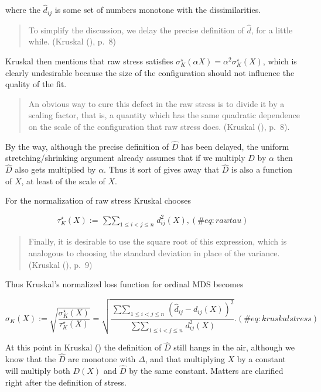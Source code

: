 \documentclass[
  12pt,
  letterpaper,
  DIV=11,
  numbers=noendperiod]{scrreprt}
\theoremstyle{remark}
\begin{document}
where the \(\hat d_{ij}\) is some set of numbers monotone with the
dissimilarities.

\begin{quote}
To simplify the discussion, we delay the precise definition of
\(\hat d\), for a little while. (Kruskal
(), p.~8)
\end{quote}

Kruskal then mentions that raw stress satisfies
\(\sigma^\star_K(\alpha X)=\alpha^2\sigma^\star_K(X)\), which is clearly
undesirable because the size of the configuration should not influence
the quality of the fit.

\begin{quote}
An obvious way to cure this defect in the raw stress is to divide it by
a scaling factor, that is, a quantity which has the same quadratic
dependence on the scale of the configuration that raw stress does.
(Kruskal (), p.~8).
\end{quote}

By the way, although the precise definition of \(\hat D\) has been
delayed, the uniform stretching/shrinking argument already assumes that
if we multiply \(D\) by \(\alpha\) then \(\hat D\) also gets multiplied
by \(\alpha\). Thus it sort of gives away that \(\hat D\) is also a
function of \(X\), at least of the scale of \(X\).

For the normalization of raw stress Kruskal chooses

\begin{equation}
\tau^\star_K(X):=\mathop{\sum\sum}_{1\leq i<j\leq n} d_{ij}^2(X),
(\#eq:rawtau)
\end{equation}

\begin{quote}
Finally, it is desirable to use the square root of this expression,
which is analogous to choosing the standard deviation in place of the
variance. (Kruskal (), p.~9)
\end{quote}

Thus Kruskal's normalized loss function for ordinal MDS becomes

\begin{equation}
\sigma_K(X):=\sqrt{\frac{\sigma^\star_K(X)}{\tau^\star_K(X)}}=\sqrt{\frac{\mathop{\sum\sum}_{1\leq i<j\leq n} (\hat d_{ij}-d_{ij}(X))^2}{\mathop{\sum\sum}_{1\leq i<j\leq n} d_{ij}^2(X)}}.
(\#eq:kruskalstress)
\end{equation}

At this point in Kruskal () the
definition of \(\hat D\) still hangs in the air, although we know that
the \(\hat D\) are monotone with \(\Delta\), and that multiplying \(X\)
by a constant will multiply both \(D(X)\) and \(\hat D\) by the same
constant. Matters are clarified right after the definition of stress.
\end{document}
